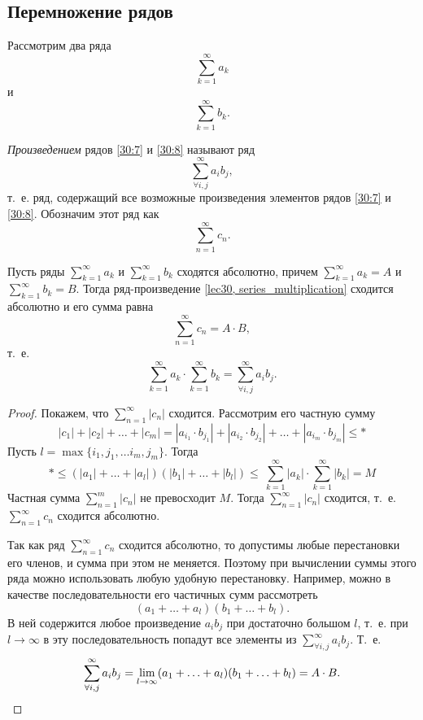 \documentclass[../../main.tex]{subfiles}
\begin{document}
\subsection{Перемножение рядов}
\begin{defn}
Рассмотрим два ряда
\begin{equation}
 \label{30:7}
 \sum\limits_{k = 1}^{\infty} a_k
\end{equation}
и
\begin{equation}
 \label{30:8}
 \sum\limits_{k = 1}^{\infty} b_k.
\end{equation}

\emph{Произведением} рядов \eqref{30:7} и
\eqref{30:8} называют ряд
\[\sum\limits_{\forall i,j}^{\infty} a_i b_j,\] т.~е. ряд, содержащий все
возможные произведения элементов рядов \eqref{30:7} и
\eqref{30:8}. Обозначим этот ряд как
\begin{equation}
	\label{lec30, series_multiplication}
	\sum\limits_{n = 1}^{\infty} c_n.
\end{equation}
\end{defn}
\begin{thm}[Коши]
	Пусть ряды $\sum\limits_{k = 1}^{\infty} a_k$ и
	$\sum\limits_{k = 1}^{\infty} b_k$ сходятся абсолютно, причем
	$\sum\limits_{k = 1}^{\infty} a_k = A$ и
	$\sum\limits_{k = 1}^{\infty} b_k = B$. Тогда ряд-произведение
	\eqref{lec30, series_multiplication} сходится абсолютно и его сумма равна
	\[\sum\limits_{n = 1}^{\infty} c_n = A \cdot B, \]
	т.~е.
	\[\sum\limits_{k = 1}^{\infty} a_k \cdot
	\sum\limits_{k = 1}^{\infty} b_k =
	\sum\limits_{\forall i,j}^{\infty} a_i b_j.\]
\end{thm}
\begin{proof}
Покажем, что $\sum\limits_{n = 1}^{\infty} |c_n|$ сходится. Рассмотрим
его частную сумму
\[|c_1| + |c_2| + \ldots + |c_m| = |a_{i_1} \cdot b_{j_1}| +
|a_{i_2} \cdot b_{j_2}| + \ldots + |a_{i_m} \cdot b_{j_m}| \leq *\]
Пусть $l = \max\{i_1, j_1, \ldots i_m, j_m\}$. Тогда
\[* \leq (|a_1| + \ldots + |a_l|)(|b_1| + \ldots + |b_l|)
\leq\ \sum\limits_{k = 1}^{\infty} |a_k| \cdot
\sum\limits_{k = 1}^{\infty} |b_k| = M\]
Частная сумма $\sum\limits_{n = 1}^{m} |c_n|$ не превосходит $M$. Тогда 
$\sum\limits_{n = 1}^{\infty} |c_n|$ сходится, т.~е.
$\sum\limits_{n = 1}^{\infty} c_n$ сходится абсолютно.

Так как ряд $\sum\limits_{n = 1}^{\infty} c_n$ сходится абсолютно, то допустимы
любые перестановки его членов, и сумма при этом не меняется. Поэтому при
вычислении суммы этого ряда можно использовать любую удобную
перестановку. Например, можно в качестве последовательности его частичных
сумм рассмотреть \[(a_1 + \ldots + a_l)(b_1 + \ldots + b_l).\] В ней
содержится любое произведение $a_i b_j$ при достаточно большом $l$, т.~е.
при $l \to \infty$ в эту последовательность попадут все элементы из
$\sum\limits_{\forall i,j}^{\infty} a_i b_j$. Т.~е.
\[\sum\limits_{\forall i,j}^{\infty} a_i b_j =
\lim\limits_{l \to \infty} (a_1 + \ldots + a_l)(b_1 + \ldots + b_l) =
A \cdot B. \qedhere\]
\end{proof}
\end{document}
